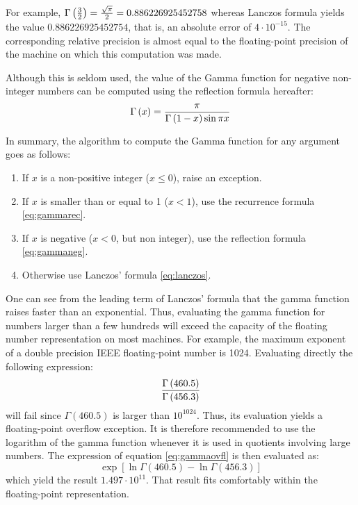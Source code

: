 \documentclass[twoside]{book}
\begin{document}
For example, $\Gamma\left({3\over 2}\right)={\sqrt{\pi}\over 2}=
0.886226925452758$ whereas Lanczos formula yields the value
$0.886226925452754$, that is, an absolute error of $4\cdot
10^{-15} $. The corresponding relative precision is almost equal
to the floating-point precision of the machine on which this
computation was made.

Although this is seldom used, the value of the Gamma function for
negative non-integer numbers can be computed using the reflection
formula hereafter:
\begin{equation}
\label{eq:gammaneg} \Gamma\left(x\right)={\pi\over
\Gamma\left(1-x\right) \sin\pi x}
\end{equation}

In summary, the algorithm to compute the Gamma function for any
argument goes as follows:
\begin{enumerate}
  \item If $x$ is a non-positive integer ($x\le0$), raise an exception.
  \item If $x$ is smaller than or equal to 1 ($x<1$), use the recurrence formula \ref{eq:gammarec}.
  \item If $x$ is negative ($x<0$, but non integer), use the reflection
formula \ref{eq:gammaneg}.
  \item Otherwise use Lanczos' formula \ref{eq:lanczos}.
\end{enumerate}

One can see from the leading term of Lanczos' formula that the
gamma function raises faster than an exponential. Thus, evaluating
the gamma function for numbers larger than a few hundreds will
exceed the capacity of the floating number representation on most
machines. For example, the maximum exponent of a double precision
IEEE floating-point number is 1024. Evaluating directly the
following expression:
\begin{equation}
\label{eq:gammaovfl}
  {\Gamma\left(460.5\right)\over\Gamma\left(456.3\right)}
\end{equation}
will fail since $\Gamma\left(460.5\right)$ is larger than
$10^{1024}$. Thus, its evaluation yields a floating-point overflow
exception. It is therefore recommended to use the logarithm of the
gamma function whenever it is used in quotients involving large
numbers. The expression of equation \ref{eq:gammaovfl} is then
evaluated as:
\begin{equation}
  \exp\left[\ln\Gamma\left(460.5\right)-\ln\Gamma\left(456.3\right)\right]
\end{equation}
which yield the result $1.497\cdot 10^{11}$. That result fits
comfortably within the floating-point representation.
\end{document}
